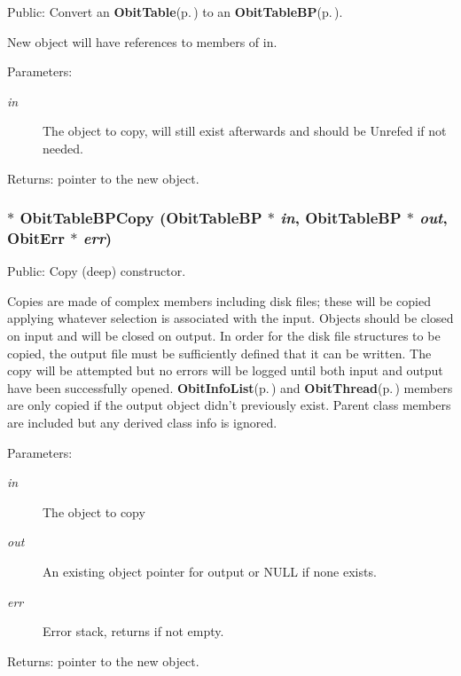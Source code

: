 Public: Convert an {\bf Obit\-Table}{\rm (p.\,\pageref{structObitTable})} to an {\bf Obit\-Table\-BP}{\rm (p.\,\pageref{structObitTableBP})}. 

New object will have references to members of in. \begin{Desc}
\item[Parameters:]
\begin{description}
\item[{\em in}]The object to copy, will still exist afterwards and should be Unrefed if not needed. \end{description}
\end{Desc}
\begin{Desc}
\item[Returns:]pointer to the new object. \end{Desc}
\subsubsection{$\ast$ Obit\-Table\-BPCopy ({\bf Obit\-Table\-BP} $\ast$ {\em in}, {\bf Obit\-Table\-BP} $\ast$ {\em out}, {\bf Obit\-Err} $\ast$ {\em err})}\label{ObitTableBP_8h_a14}


Public: Copy (deep) constructor. 

Copies are made of complex members including disk files; these will be copied applying whatever selection is associated with the input. Objects should be closed on input and will be closed on output. In order for the disk file structures to be copied, the output file must be sufficiently defined that it can be written. The copy will be attempted but no errors will be logged until both input and output have been successfully opened. {\bf Obit\-Info\-List}{\rm (p.\,\pageref{structObitInfoList})} and {\bf Obit\-Thread}{\rm (p.\,\pageref{structObitThread})} members are only copied if the output object didn't previously exist. Parent class members are included but any derived class info is ignored. \begin{Desc}
\item[Parameters:]
\begin{description}
\item[{\em in}]The object to copy \item[{\em out}]An existing object pointer for output or NULL if none exists. \item[{\em err}]Error stack, returns if not empty. \end{description}
\end{Desc}
\begin{Desc}
\item[Returns:]pointer to the new object. \end{Desc}

